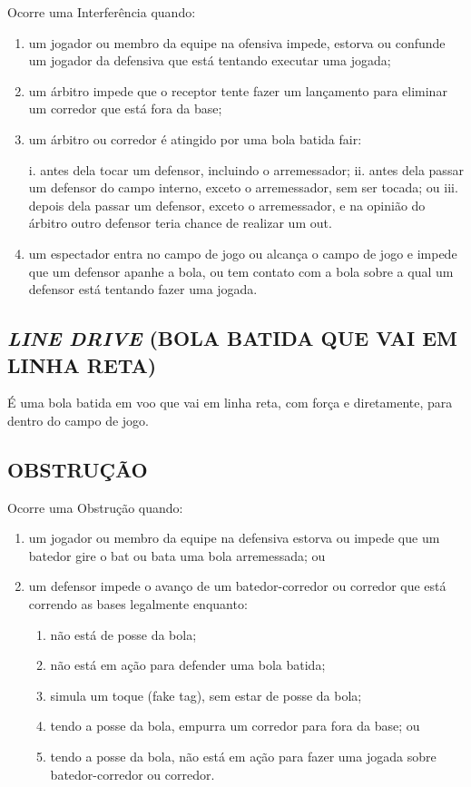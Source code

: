 Ocorre uma Interferência quando:

\begin{enumerate}[label=(\alph*)]
	\item   um jogador ou membro da equipe na ofensiva impede, estorva ou confunde um jogador da defensiva que está tentando executar uma jogada;
	\item  um árbitro impede que o receptor tente fazer um lançamento para eliminar um corredor que está fora da base;
	\item  um árbitro ou corredor é atingido por uma bola batida \gls{fair}:

	i. antes dela tocar um defensor, incluindo o arremessador;
	ii. antes dela passar um defensor do campo interno, exceto o arremessador, sem
	ser tocada; ou
	iii. depois dela passar um defensor, exceto o arremessador, e na opinião do árbitro outro defensor teria chance de realizar um \gls{out}.

	\item  um espectador entra no campo de jogo ou alcança o campo de jogo e impede que um defensor apanhe a bola, ou tem contato com a bola sobre a  qual um defensor está tentando fazer uma jogada.
\end{enumerate}

\subsection{\textit{LINE DRIVE} (BOLA BATIDA QUE VAI EM LINHA RETA)}

É uma bola batida em voo que vai em linha reta, com força e diretamente, para dentro do campo de jogo.

\subsection{OBSTRUÇÃO}

Ocorre uma Obstrução quando:
\begin{enumerate}[label=(\alph*)]
	\item   um jogador ou membro da equipe na defensiva estorva ou impede que um batedor gire o \gls{bat} ou bata uma bola arremessada; ou
	\item  um defensor impede o avanço de um batedor-corredor ou corredor que está correndo as bases legalmente enquanto:

	\begin{enumerate}[label= \roman*.]
		\item não está de posse da bola;
		\item não está em ação para defender uma bola batida;
		\item simula um toque (\gls{fake tag}), sem estar de posse da bola;
		\item tendo a posse da bola, empurra um corredor para fora da base; ou
		\item tendo a posse da bola, não está em ação para fazer uma jogada sobre batedor-corredor ou corredor.
	\end{enumerate}
\end{enumerate}

